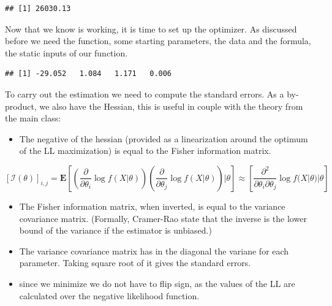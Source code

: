 \documentclass[]{book}
\newenvironment{Shaded}{\begin{snugshade}}{\end{snugshade}}
\newcommand{\KeywordTok}[1]{\textcolor[rgb]{0.13,0.29,0.53}{\textbf{#1}}}
\newcommand{\DataTypeTok}[1]{\textcolor[rgb]{0.13,0.29,0.53}{#1}}
\newcommand{\DecValTok}[1]{\textcolor[rgb]{0.00,0.00,0.81}{#1}}
\newcommand{\StringTok}[1]{\textcolor[rgb]{0.31,0.60,0.02}{#1}}
\newcommand{\OtherTok}[1]{\textcolor[rgb]{0.56,0.35,0.01}{#1}}
\newcommand{\OperatorTok}[1]{\textcolor[rgb]{0.81,0.36,0.00}{\textbf{#1}}}
\newcommand{\NormalTok}[1]{#1}
\providecommand{\tightlist}{%
  \setlength{\itemsep}{0pt}\setlength{\parskip}{0pt}}
\begin{document}
\begin{verbatim}
## [1] 26030.13
\end{verbatim}

Now that we know is working, it is time to set up the optimizer. As
discussed before we need the function, some starting parameters, the
data and the formula, the static inputs of our function.

\begin{Shaded}
\end{Shaded}

\begin{verbatim}
## [1] -29.052   1.084   1.171   0.006
\end{verbatim}

To carry out the estimation we need to compute the standard errors. As a
by-product, we also have the Hessian, this is useful in couple with the
theory from the main class:

\begin{itemize}
\tightlist
\item
  The negative of the hessian (provided as a linearization around the
  optimum of the LL maximization) is equal to the Fisher information
  matrix.
\end{itemize}

\[[\mathcal{I}(\theta)]_{i,j}= \mathbf{E}\left[\left(\frac{\partial}{\partial \theta_i} \log f(X|\theta)\right)\left(\frac{\partial}{\partial \theta_j} \log f(X|\theta)\right)|\theta\right]\approx\left[\frac{\partial^2}{\partial \theta_i \partial \theta_j} \log f(X|\theta)|\theta\right]\]

\begin{itemize}
\item
  The Fisher information matrix, when inverted, is equal to the variance
  covariance matrix. (Formally, Cramer-Rao state that the inverse is the
  lower bound of the variance if the estimator is unbiased.)
\item
  The variance covariance matrix has in the diagonal the variane for
  each parameter. Taking square root of it gives the standard errors.
\item
  since we minimize we do not have to flip sign, as the values of the LL
  are calculated over the negative likelihood function.
\end{itemize}
\end{document}
